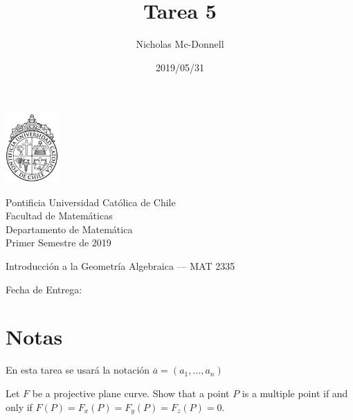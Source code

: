 

\title{Tarea 5}
\author{Nicholas Mc-Donnell}
\date{2019/05/31}



\begin{minipage}{2.5cm}
    \includegraphics[width=2cm]{../../figures/logo1.jpg}
\end{minipage}
\begin{minipage}{13cm}
    \begin{flushleft}
        \raggedright{
            \noindent
            {\sc Pontificia Universidad Católica de Chile\\
                Facultad de Matemáticas\\
                Departamento de Matemática} \smallskip \\
            Primer Semestre de 2019\\
        }
    \end{flushleft}
\end{minipage}

\vspace{2ex}
{\Large \centerline{\bf \thetitle}}
{\large \centerline{Introducción a la Geometría Algebraica --- MAT 2335}}
{\normalsize \centerline{ Fecha de Entrega: \thedate}}
\vfill

\begin{flushright}
    {\large\theauthor}
\end{flushright}
\newpage
\normalsize
{}
\tableofcontents
\newpage

\section*{Notas}
En esta tarea se usará la notación \(\overline{a}=(a_1,\dots ,a_n)\)\\


\begin{prob}{5.1}
    Let \(F\) be a projective plane curve. Show that a point \(P\) is a multiple point if and only if \(F(P)=F_x(P)=F_y(P)=F_z(P)=0\).
\end{prob}

